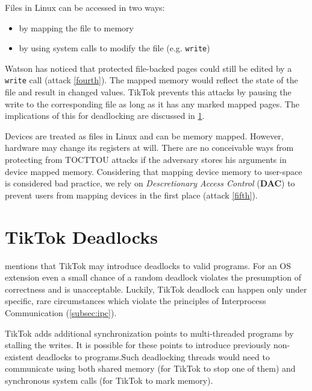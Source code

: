 Files in Linux can be accessed in two ways:
\begin{itemize}
    \item by mapping the file to memory
    \item by using system calls to modify the file (e.g. \texttt{write})
\end{itemize}

Watson has noticed that protected file-backed pages could still be edited by a
\texttt{write} call (attack \ref{fourth}). The mapped memory would reflect the state
of the file and result in changed values. TikTok prevents this attacks by
pausing the write to the corresponding file as long as it has any marked mapped
pages. The implications of this for deadlocking are discussed in
\cref{sec:deadlocks}. 

Devices are treated as files in Linux and can be memory mapped. However, 
hardware may change its registers at will. There are no conceivable ways from 
protecting from TOCTTOU attacks if the adversary stores his arguments in device
mapped memory. Considering that mapping device memory to user-space is considered
bad practice, we rely on \emph{Descretionary Access Control} (\textbf{DAC}) to 
prevent users from mapping devices in the first place (attack \ref{fifth}).


\section{TikTok Deadlocks}
\label{sec:deadlocks}

 mentions that TikTok may introduce deadlocks to valid
programs. For an OS extension even a small chance of a random deadlock violates
the presumption of correctness and is unacceptable. Luckily, TikTok deadlock can
happen only under specific, rare circumstances which violate the principles of
Interprocess Communication (\cref{subsec:ipc}).

TikTok adds additional synchronization points to multi-threaded programs by
stalling the writes. It is possible for these points to introduce previously
non-existent deadlocks to programs.Such deadlocking threads would need to
communicate using both shared memory (for TikTok to stop one of them) and
synchronous system calls (for TikTok to mark memory).


